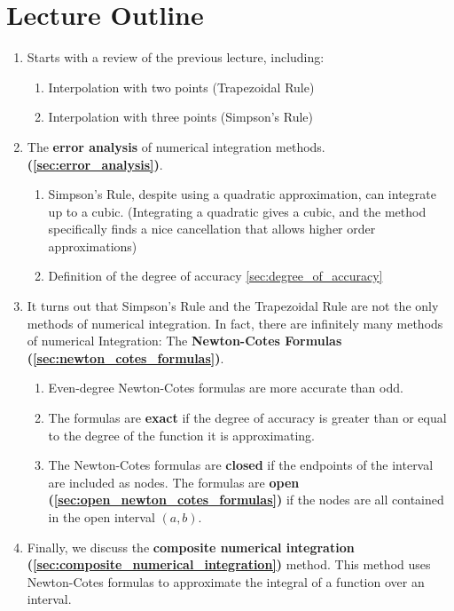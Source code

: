 \section*{Lecture Outline}

\begin{enumerate}
\item Starts with a review of the previous lecture, including:
  \begin{enumerate}[label=(\alph*)]
  \item Interpolation with two points (Trapezoidal Rule)
  \item Interpolation with three points (Simpson's Rule)
  \end{enumerate}
\item The \textbf{error analysis} of numerical integration methods.
  \textbf{(\ref{sec:error_analysis})}.
  \begin{enumerate}[label=(\alph*)]
  \item Simpson's Rule, despite using a quadratic approximation, can integrate
    up to a cubic. (Integrating a quadratic gives a cubic, and the method
    specifically finds a nice cancellation that allows higher order
    approximations)
  \item Definition of the degree of accuracy \ref{sec:degree_of_accuracy}
  \end{enumerate}
\item It turns out that Simpson's Rule and the Trapezoidal Rule are not the only
  methods of numerical integration. In fact, there are infinitely many methods
  of numerical Integration: The \textbf{Newton-Cotes Formulas
  (\ref{sec:newton_cotes_formulas})}.
  \begin{enumerate}[label=(\alph*)]
  \item Even-degree Newton-Cotes formulas are more accurate than odd.
  \item The formulas are \textbf{exact} if the degree of accuracy
    is greater than or equal to the degree of the function it is approximating.
  \item The Newton-Cotes formulas are \textbf{closed} if the endpoints of the
    interval are included as nodes. The formulas are \textbf{open
    (\ref{sec:open_newton_cotes_formulas})} if the nodes are all contained in
    the open interval $(a,b)$.
  \end{enumerate}
\item Finally, we discuss the \textbf{composite numerical integration
  (\ref{sec:composite_numerical_integration})} method. This method uses
  Newton-Cotes formulas to approximate the integral of a function over an
  interval.
\end{enumerate}


